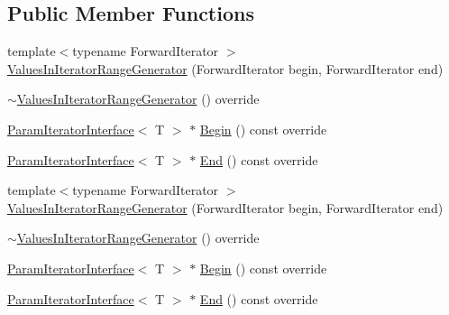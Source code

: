 \subsection*{Public Member Functions}
\begin{DoxyCompactItemize}
\item 
{\footnotesize template$<$typename Forward\+Iterator $>$ }\\\mbox{\hyperlink{classtesting_1_1internal_1_1_values_in_iterator_range_generator_a8b30f6028bc5739bbd7c24b0f0e409f7}{Values\+In\+Iterator\+Range\+Generator}} (Forward\+Iterator begin, Forward\+Iterator end)
\item 
\mbox{\hyperlink{classtesting_1_1internal_1_1_values_in_iterator_range_generator_a9070d5b79803164625d3aa77a1659e9f}{$\sim$\+Values\+In\+Iterator\+Range\+Generator}} () override
\item 
\mbox{\hyperlink{classtesting_1_1internal_1_1_param_iterator_interface}{Param\+Iterator\+Interface}}$<$ T $>$ $\ast$ \mbox{\hyperlink{classtesting_1_1internal_1_1_values_in_iterator_range_generator_a71ffed6f1deba05f11c9d45f6ab5b85d}{Begin}} () const override
\item 
\mbox{\hyperlink{classtesting_1_1internal_1_1_param_iterator_interface}{Param\+Iterator\+Interface}}$<$ T $>$ $\ast$ \mbox{\hyperlink{classtesting_1_1internal_1_1_values_in_iterator_range_generator_a298cfb66a90b1a39c0cea3ca7ae1ece1}{End}} () const override
\item 
{\footnotesize template$<$typename Forward\+Iterator $>$ }\\\mbox{\hyperlink{classtesting_1_1internal_1_1_values_in_iterator_range_generator_a8b30f6028bc5739bbd7c24b0f0e409f7}{Values\+In\+Iterator\+Range\+Generator}} (Forward\+Iterator begin, Forward\+Iterator end)
\item 
\mbox{\hyperlink{classtesting_1_1internal_1_1_values_in_iterator_range_generator_a9070d5b79803164625d3aa77a1659e9f}{$\sim$\+Values\+In\+Iterator\+Range\+Generator}} () override
\item 
\mbox{\hyperlink{classtesting_1_1internal_1_1_param_iterator_interface}{Param\+Iterator\+Interface}}$<$ T $>$ $\ast$ \mbox{\hyperlink{classtesting_1_1internal_1_1_values_in_iterator_range_generator_a71ffed6f1deba05f11c9d45f6ab5b85d}{Begin}} () const override
\item 
\mbox{\hyperlink{classtesting_1_1internal_1_1_param_iterator_interface}{Param\+Iterator\+Interface}}$<$ T $>$ $\ast$ \mbox{\hyperlink{classtesting_1_1internal_1_1_values_in_iterator_range_generator_a298cfb66a90b1a39c0cea3ca7ae1ece1}{End}} () const override

\end{DoxyCompactItemize}
